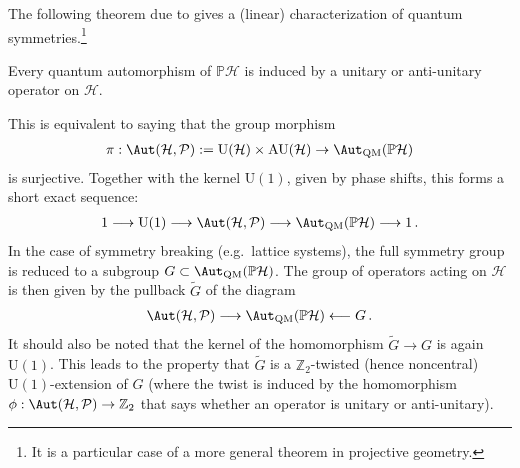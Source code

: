 

    The following theorem due to  gives a (linear) characterization of quantum symmetries.\footnote{It is a particular case of a more general theorem in projective geometry.}
    \begin{theorem}[Wigner]
        Every quantum automorphism of $\mathbb{P}\mathcal{H}$ is induced by a unitary or anti-unitary operator on $\mathcal{H}$.
    \end{theorem}
    This is equivalent to saying that the group morphism
    \begin{gather}
        \pi:\Aut(\mathcal{H},\mathcal{P}):=\mathrm{U}(\mathcal{H})\times\mathrm{AU}(\mathcal{H})\rightarrow\Aut_{\text{QM}}(\mathbb{P}\mathcal{H})
    \end{gather}
    is surjective. Together with the kernel $\mathrm{U}(1)$, given by phase shifts, this forms a short exact sequence:
    \begin{gather}
        1\longrightarrow\mathrm{U}(1)\longrightarrow\Aut(\mathcal{H},\mathcal{P})\longrightarrow\Aut_{\text{QM}}(\mathbb{P}\mathcal{H})\longrightarrow1\,.
    \end{gather}
    In the case of symmetry breaking (e.g.~lattice systems), the full symmetry group is reduced to a subgroup $G\subset\Aut_{\text{QM}}(\mathbb{P}\mathcal{H})$. The group of operators acting on $\mathcal{H}$ is then given by the pullback $\widetilde{G}$ of the diagram
    \begin{gather}
        \Aut(\mathcal{H},\mathcal{P})\longrightarrow\Aut_{\text{QM}}(\mathbb{P}\mathcal{H})\longleftarrow G\,.
    \end{gather}
    It should also be noted that the kernel of the homomorphism $\widetilde{G}\rightarrow G$ is again $\mathrm{U}(1)$. This leads to the property that $\widetilde{G}$ is a $\mathbb{Z}_2$-twisted (hence noncentral) $\mathrm{U}(1)$-extension of $G$ (where the twist is induced by the homomorphism $\phi:\Aut(\mathcal{H},\mathcal{P})\rightarrow\mathbb{Z}_2$ that says whether an operator is unitary or anti-unitary).


